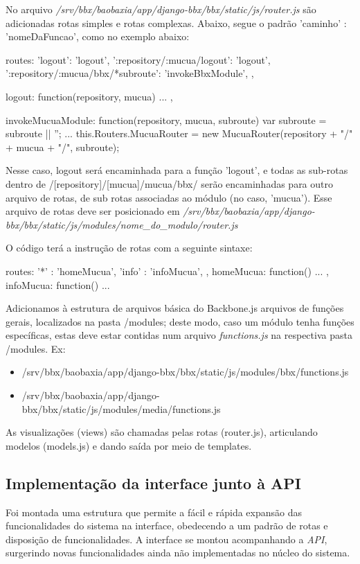 No arquivo \emph{/srv/bbx/baobaxia/app/django-bbx/bbx/static/js/router.js} são
adicionadas rotas simples e rotas complexas. Abaixo, segue o padrão 'caminho' : 'nomeDaFuncao',
como no exemplo abaixo:

\begin{code}
  routes: {
    'logout': 'logout',
    ':repository/:mucua/logout': 'logout',
    ':repository/:mucua/bbx/*subroute': 'invokeBbxModule',
  },
  
  logout: function(repository, mucua) {
    ...
  },
  
  invokeMucuaModule: function(repository, mucua, subroute) {
    var subroute = subroute || '';
    ...
    this.Routers.MucuaRouter = new MucuaRouter(repository + "/" + mucua + "/", subroute);
  }      
\end{code}

Nesse caso, logout será encaminhada para a função 'logout', e todas as sub-rotas dentro
de /[repository]/[mucua]/mucua/bbx/ serão encaminhadas para outro arquivo de rotas,
de sub rotas associadas ao módulo (no caso, 'mucua'). Esse arquivo de rotas deve ser
posicionado em \emph{/srv/bbx/baobaxia/app/django-bbx/bbx/static/js/modules/nome\_do\_modulo/router.js}

O código terá a instrução de rotas com a seguinte sintaxe:

\begin{code}
  routes: {
    '*' : 'homeMucua',
    'info' : 'infoMucua',
  },
  homeMucua: function() {
    ...
  },
  infoMucua: function() {
    ...
  }
\end{code}

Adicionamos à estrutura de arquivos básica do Backbone.js arquivos de funções gerais,
localizados na pasta /modules; deste modo, caso um módulo tenha funções
específicas, estas deve estar contidas num arquivo \emph{functions.js} na
respectiva pasta /modules. Ex:

\begin{itemize}
  \item /srv/bbx/baobaxia/app/django-bbx/bbx/static/js/modules/bbx/functions.js
  \item /srv/bbx/baobaxia/app/django-bbx/bbx/static/js/modules/media/functions.js
\end{itemize}

As visualizações (views) são chamadas pelas rotas (router.js), articulando modelos
(models.js) e dando saída por meio de templates.

\subsection{Implementação da interface junto à API}
Foi montada uma estrutura que permite a fácil e rápida expansão das
funcionalidades do sistema na interface, obedecendo a um padrão de rotas e
disposição de funcionalidades. A interface se montou acompanhando a \emph{API},
surgerindo novas funcionalidades ainda não implementadas no núcleo do sistema.

